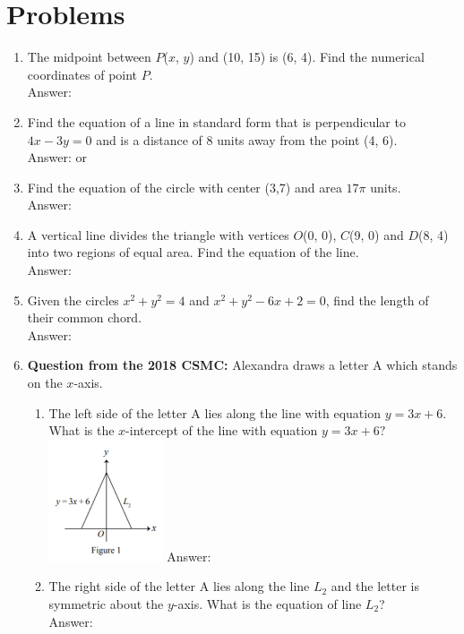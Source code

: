 \documentclass[12pt]{extarticle}
\begin{document}
\section{Problems}
\begin{enumerate}
    \itemsep 2.0em
    \item {The midpoint between $P$($x$, $y$) and (10, 15) is (6, 4). Find the numerical coordinates of point $P$. \\Answer: }
    \item {Find the equation of a line in standard form that is perpendicular to $4x - 3y = 0$ and is a distance of 8 units away from the point (4, 6). \\Answer:  or }
    \item {Find the equation of the circle with center (3,7) and area $17\pi$ units. \\Answer: }
    \item {A vertical line divides the triangle with vertices $O$(0, 0), $C$(9, 0) and $D$(8, 4) into two regions of equal area. Find the equation of the line. \\Answer: }
    \item {Given the circles $x^2 + y^2 = 4$ and $x^2 + y^2 - 6x + 2 = 0$, find the length of their common chord. \\Answer: }
    \item {\textbf{Question from the 2018 CSMC:} Alexandra draws a letter A which stands on the $x$-axis.
    \begin{enumerate}
        \itemsep 2.0em
        \item {The left side of the letter A lies along the line with equation $y = 3x + 6$. What is the $x$-intercept of the line with equation $y = 3x + 6?$\\
        \includegraphics{CSMC2018_B1a.png} Answer: }
        \item {The right side of the letter A lies along the line $L_2$ and the letter is symmetric about the $y$-axis. What is the equation of line $L_2$? \\Answer: }

\end{enumerate}}
\end{enumerate}
\end{document}

